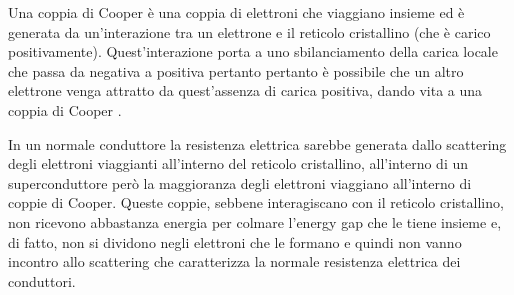 \documentclass[a4paper,10pt]{article}
\begin{document}
Una coppia di Cooper è una coppia di elettroni che viaggiano insieme ed è generata da un'interazione
tra un elettrone e il reticolo cristallino (che è carico positivamente). Quest'interazione porta a
uno sbilanciamento della carica locale che passa da negativa a positiva pertanto pertanto è
possibile che un altro elettrone venga attratto da quest'assenza di carica positiva, dando vita a
una coppia di Cooper \cite{cooper-cambridge}.

In un normale conduttore la resistenza elettrica sarebbe generata dallo scattering degli elettroni
viaggianti all'interno del reticolo cristallino, all'interno di un superconduttore però la
maggioranza degli elettroni viaggiano all'interno di coppie di Cooper. Queste coppie, sebbene
interagiscano con il reticolo cristallino, non ricevono abbastanza energia per colmare l'energy gap
che le tiene insieme e, di fatto, non si dividono negli elettroni che le formano e quindi non vanno
incontro allo scattering che caratterizza la normale resistenza elettrica dei conduttori.



\clearpage
\end{document}
